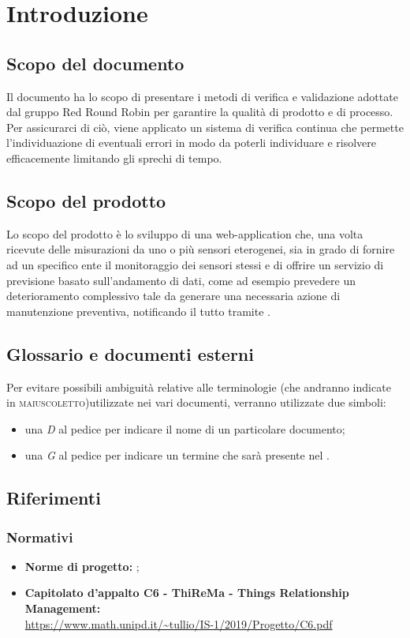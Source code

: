 \section{Introduzione}
	\subsection{Scopo del documento}
		Il documento ha lo scopo di presentare i metodi di verifica e validazione adottate dal gruppo Red Round Robin per garantire la qualità di prodotto e di processo. Per assicurarci di ciò, viene applicato un sistema di verifica continua che permette l'individuazione di eventuali errori in modo da poterli individuare e risolvere efficacemente limitando gli sprechi di tempo.
	\subsection{Scopo del prodotto}
		Lo scopo del prodotto è lo sviluppo di una web-application che, una volta ricevute delle misurazioni da uno o più sensori eterogenei, sia in grado di fornire ad un specifico ente il monitoraggio dei sensori stessi e di offrire un servizio di previsione basato sull'andamento di dati, come ad esempio prevedere un deterioramento complessivo tale da generare una necessaria azione di manutenzione preventiva, notificando il tutto tramite .

	\subsection{Glossario e documenti esterni}
		Per evitare possibili ambiguità relative alle terminologie (che andranno indicate in \textsc{maiuscoletto})utilizzate nei vari documenti, verranno utilizzate due simboli:
		\begin{itemize}
			\item una \textit{D} al pedice per indicare il nome di un particolare documento;
			\item una \textit{G} al pedice per indicare un termine che sarà 
			presente nel .
		\end{itemize}

	\subsection{Riferimenti}
		\subsubsection{Normativi}
		\begin{itemize}
			\item \textbf{Norme di progetto:} ;
			\item \textbf{Capitolato d’appalto C6 - ThiReMa - Things Relationship Management:}\\
			\url{https://www.math.unipd.it/~tullio/IS-1/2019/Progetto/C6.pdf}
		\end{itemize}
